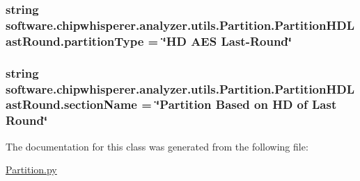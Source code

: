 \subsubsection[{partition\+Type}]{\setlength{\rightskip}{0pt plus 5cm}string software.\+chipwhisperer.\+analyzer.\+utils.\+Partition.\+Partition\+H\+D\+Last\+Round.\+partition\+Type = \char`\"{}H\+D A\+E\+S Last-\/Round\char`\"{}\hspace{0.3cm}{\ttfamily [static]}}\label{classsoftware_1_1chipwhisperer_1_1analyzer_1_1utils_1_1Partition_1_1PartitionHDLastRound_ae335e15aa1d255853295367496c7d664}
\hypertarget{classsoftware_1_1chipwhisperer_1_1analyzer_1_1utils_1_1Partition_1_1PartitionHDLastRound_a5cf7c20f9ff03f5d82b31be65e77f7e2}{}
\subsubsection[{section\+Name}]{\setlength{\rightskip}{0pt plus 5cm}string software.\+chipwhisperer.\+analyzer.\+utils.\+Partition.\+Partition\+H\+D\+Last\+Round.\+section\+Name = \char`\"{}Partition Based on H\+D of Last Round\char`\"{}\hspace{0.3cm}{\ttfamily [static]}}\label{classsoftware_1_1chipwhisperer_1_1analyzer_1_1utils_1_1Partition_1_1PartitionHDLastRound_a5cf7c20f9ff03f5d82b31be65e77f7e2}


The documentation for this class was generated from the following file\+:\begin{DoxyCompactItemize}
\item 
\hyperlink{Partition_8py}{Partition.\+py}\end{DoxyCompactItemize}
